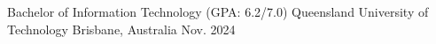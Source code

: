 

\begin{cventries}

  \cventry
    {Bachelor of Information Technology (GPA: 6.2/7.0)} %
    {Queensland University of Technology} %
    {Brisbane, Australia} %
    {Nov. 2024} %
    {}

\end{cventries}

